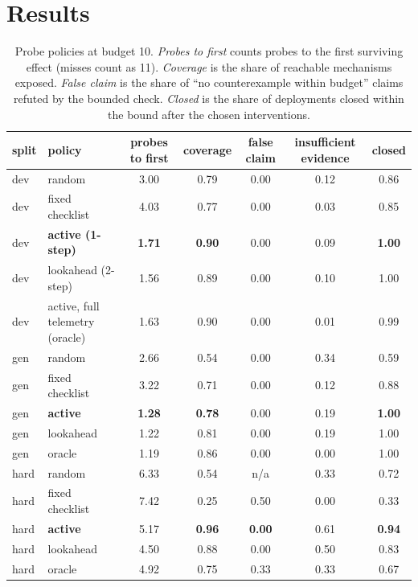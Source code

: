 \documentclass[10pt]{article}
\begin{document}
\section{Results}
\begin{table}[h]\footnotesize\centering
\caption{Probe policies at budget 10. \emph{Probes to first} counts probes to the first surviving effect (misses count as 11). \emph{Coverage} is the share of reachable mechanisms exposed. \emph{False claim} is the share of ``no counterexample within budget'' claims refuted by the bounded check. \emph{Closed} is the share of deployments closed within the bound after the chosen interventions.}
\begin{tabular}{@{}llccccc@{}}\toprule
split & policy & probes to first & coverage & false claim & insufficient evidence & closed\\\midrule
dev & random & 3.00 & 0.79 & 0.00 & 0.12 & 0.86\\
dev & fixed checklist & 4.03 & 0.77 & 0.00 & 0.03 & 0.85\\
dev & \textbf{active (1-step)} & \textbf{1.71} & \textbf{0.90} & 0.00 & 0.09 & \textbf{1.00}\\
dev & lookahead (2-step) & 1.56 & 0.89 & 0.00 & 0.10 & 1.00\\
dev & active, full telemetry (oracle) & 1.63 & 0.90 & 0.00 & 0.01 & 0.99\\\midrule
gen & random & 2.66 & 0.54 & 0.00 & 0.34 & 0.59\\
gen & fixed checklist & 3.22 & 0.71 & 0.00 & 0.12 & 0.88\\
gen & \textbf{active} & \textbf{1.28} & \textbf{0.78} & 0.00 & 0.19 & \textbf{1.00}\\
gen & lookahead & 1.22 & 0.81 & 0.00 & 0.19 & 1.00\\
gen & oracle & 1.19 & 0.86 & 0.00 & 0.00 & 1.00\\\midrule
hard & random & 6.33 & 0.54 & n/a & 0.33 & 0.72\\
hard & fixed checklist & 7.42 & 0.25 & 0.50 & 0.00 & 0.33\\
hard & \textbf{active} & 5.17 & \textbf{0.96} & \textbf{0.00} & 0.61 & \textbf{0.94}\\
hard & lookahead & 4.50 & 0.88 & 0.00 & 0.50 & 0.83\\
hard & oracle & 4.92 & 0.75 & 0.33 & 0.33 & 0.67\\
\bottomrule\end{tabular}
\end{table}
\end{document}
